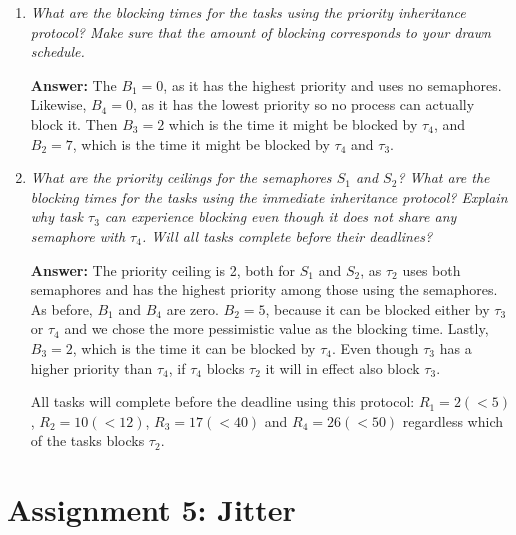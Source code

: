 \documentclass[a4paper,10pt]{article}
\newcommand{\answer}{\textbf{Answer: }}
\begin{document}
\begin{enumerate}
	\item \emph{What are the blocking times for the tasks using the priority inheritance protocol? Make sure that the amount of blocking corresponds to your drawn schedule.}
	
	\answer The $B_1 = 0$, as it has the highest priority and uses no semaphores. Likewise, $B_4 = 0$, as it has the lowest priority so no process can actually block it. Then $B_3 = 2$ which is the time it might be blocked by $\tau_4$, and $B_2 = 7$, which is the time it might be blocked by $\tau_4$ and $\tau_3$.
	
	\item \emph{What are the priority ceilings for the semaphores $S_1$ and $S_2$? What are the blocking times for the tasks using the immediate inheritance protocol? Explain why task $\tau_3$ can experience blocking even though it does not share any semaphore with $\tau_4$. Will all tasks complete before their deadlines?}
	
	\answer The priority ceiling is 2, both for $S_1$ and $S_2$, as $\tau_2$ uses both semaphores and has the highest priority among those using the semaphores. As before, $B_1$ and $B_4$ are zero. $B_2 = 5$, because it can be blocked either by $\tau_3$ or $\tau_4$ and we chose the more pessimistic value as the blocking time. Lastly, $B_3 = 2$, which is the time it can be blocked by $\tau_4$. Even though $\tau_3$ has a higher priority than $\tau_4$, if $\tau_4$ blocks $\tau_2$ it will in effect also block $\tau_3$.

	All tasks will complete before the deadline using this protocol: $R_1 = 2 (<5)$, $R_2 = 10 (<12)$, $R_3 = 17 (<40)$ and $R_4 = 26 (<50)$ regardless which of the tasks blocks $\tau_2$.
\end{enumerate}

\section{Assignment 5: Jitter}
\end{document}
